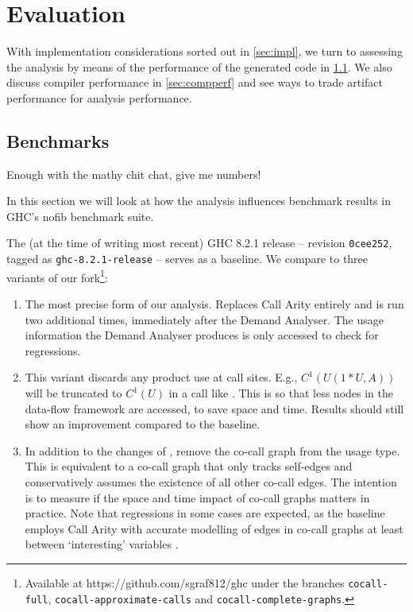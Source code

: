 \chapter{Evaluation}\label{sec:eval}

With implementation considerations sorted out in \cref{sec:impl}, we turn to assessing the analysis by means of the performance of the generated code in \cref{sec:bench}.
We also discuss compiler performance in \cref{sec:compperf} and see ways to trade artifact performance for analysis performance.

\section{Benchmarks}\label{sec:bench}

Enough with the mathy chit chat, give me numbers!

In this section we will look at how the analysis influences benchmark results in GHC's nofib \parencite{nofib} benchmark suite.

The (at the time of writing most recent) GHC 8.2.1 release -- revision \texttt{0cee252}, tagged as \texttt{ghc-8.2.1-release} -- serves as a baseline. We compare to three variants of our fork\footnote{Available at https://github.com/sgraf812/ghc under the branches \texttt{cocall-full}, \texttt{cocall-approximate-calls} and \texttt{cocall-complete-graphs}.}:

\begin{enumerate}
  \item[\varfull] 
    The most precise form of our analysis. 
    Replaces Call Arity entirely and is run two additional times, immediately after the Demand Analyser. 
    The usage information the Demand Analyser produces is only accessed to check for regressions.
  \item[\varcalls]
    This variant discards any product use at call sites. 
    E.g., $C^1(U(1*U,A))$ will be truncated to $C^1(U)$ in a call like . 
    This is so that less nodes in the data-flow framework are accessed, to save space and time.
    Results should still show an improvement compared to the baseline.
  \item[\varedges]
    In addition to the changes of \varcalls, remove the co-call graph from the usage type. 
    This is equivalent to a co-call graph that only tracks self-edges and conservatively assumes the existence of all other co-call edges.
    The intention is to measure if the space and time impact of co-call graphs matters in practice.
    Note that regressions in some cases are expected, as the baseline employs Call Arity with accurate modelling of edges in co-call graphs at least between `interesting' variables \parencite[section~3.4.1]{callarity}.
\end{enumerate}

